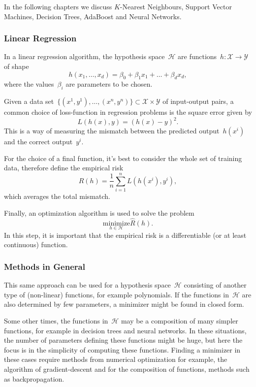 In the following chapters we discuss $K$-Nearest Neighbours, Support Vector Machines,  Decision Trees, AdaBoost and Neural Networks.

\subsubsection{Linear Regression}
In a linear regression algorithm, the hypothesis space~$\mathcal{H}$ are functions~$h: \mathcal{X} \rightarrow \mathcal{Y}$ of shape
\[
h(x_1, \dots, x_d) = \beta_0 + \beta_1x_1 + \dots + \beta_dx_d,
\]
where the values~$\beta_i$ are parameters to be chosen. 

Given a data set~$\{(x^1, y^1), \dots, (x^n, y^n)\} \subset \mathcal{X} \times \mathcal{Y}$ of input-output pairs, a common choice of loss-function in regression problems is the square error given by
\[
L(h(x), y) = (h(x) - y)^2.
\]
This is a way of measuring the mismatch between the predicted output~$h(x^i)$ and the correct output~$y^i$.

For the choice of a final function, it's best to consider the whole set of training data, therefore define the empirical risk
\[
\hat{R}(h) = \frac{1}{n} \sum_{i = 1}^{n} L(h(x^i), y^i),
\]  
which averages the total mismatch. 

Finally, an optimization algorithm is used to solve the problem
\[
\underset{h \in \mathcal{H}}{\text{minimize}} \hat{R}(h).
\]
In this step, it is important that the empirical risk is a differentiable (or at least continuous) function.

\subsubsection{Methods in General}

This same approach can be used for a hypothesis space~$\mathcal{H}$ consisting of another type of (non-linear) functions, for example polynomials. If the functions in~$\mathcal{H}$ are also determined by few parameters, a minimizer might be found in closed form. 

Some other times, the functions in~$\mathcal{H}$ may be a composition of many simpler functions, for example in decision trees and neural networks. In these situations, the number of parameters defining these functions might be huge, but here the focus is in the simplicity of computing these functions. Finding a minimizer in these cases require methods from numerical optimization for example, the algorithm of gradient-descent and for the composition of functions, methods such as backpropagation.

